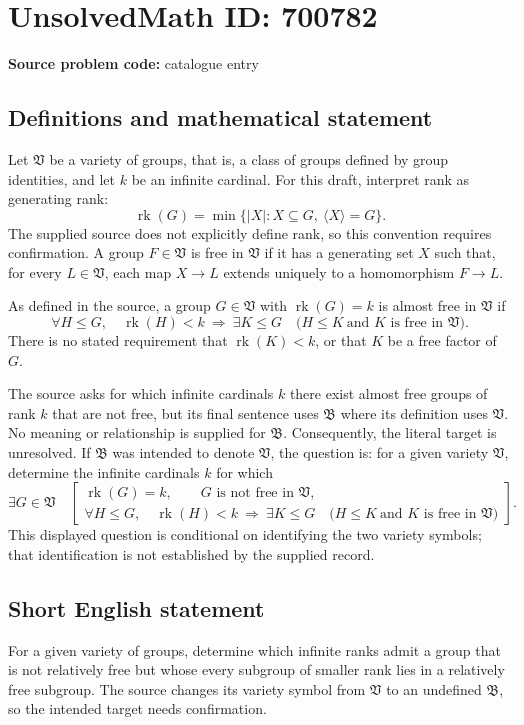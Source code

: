 \documentclass[11pt]{article}
\begin{document}
\section*{UnsolvedMath ID: 700782}
\textbf{Source problem code:} catalogue entry
\subsection{Definitions and mathematical statement}
Let \(\mathfrak V\) be a variety of groups, that is, a class of groups defined by group identities, and let \(k\) be an infinite cardinal. For this draft, interpret rank as generating rank:
\[
\operatorname{rk}(G)=\min\{\lvert X\rvert:X\subseteq G,\ \langle X\rangle=G\}.
\]
The supplied source does not explicitly define rank, so this convention requires confirmation. A group \(F\in\mathfrak V\) is free in \(\mathfrak V\) if it has a generating set \(X\) such that, for every \(L\in\mathfrak V\), each map \(X\to L\) extends uniquely to a homomorphism \(F\to L\).

As defined in the source, a group \(G\in\mathfrak V\) with \(\operatorname{rk}(G)=k\) is almost free in \(\mathfrak V\) if
\[
\forall H\leq G,\quad
\operatorname{rk}(H)<k\ \Longrightarrow\
\exists K\leq G\quad
\bigl(H\leq K\ \text{and }K\text{ is free in }\mathfrak V\bigr).
\]
There is no stated requirement that \(\operatorname{rk}(K)<k\), or that \(K\) be a free factor of \(G\).

The source asks for which infinite cardinals \(k\) there exist almost free groups of rank \(k\) that are not free, but its final sentence uses \(\mathfrak B\) where its definition uses \(\mathfrak V\). No meaning or relationship is supplied for \(\mathfrak B\). Consequently, the literal target is unresolved. If \(\mathfrak B\) was intended to denote \(\mathfrak V\), the question is: for a given variety \(\mathfrak V\), determine the infinite cardinals \(k\) for which
\[
\exists G\in\mathfrak V\quad
\left[
\begin{gathered}
\operatorname{rk}(G)=k,\qquad G\text{ is not free in }\mathfrak V,\\
\forall H\leq G,\quad
\operatorname{rk}(H)<k\ \Longrightarrow\
\exists K\leq G\quad
\bigl(H\leq K\ \text{and }K\text{ is free in }\mathfrak V\bigr)
\end{gathered}
\right].
\]
This displayed question is conditional on identifying the two variety symbols; that identification is not established by the supplied record.
\subsection{Short English statement}
For a given variety of groups, determine which infinite ranks admit a group that is not relatively free but whose every subgroup of smaller rank lies in a relatively free subgroup. The source changes its variety symbol from \(\mathfrak V\) to an undefined \(\mathfrak B\), so the intended target needs confirmation.
\end{document}
